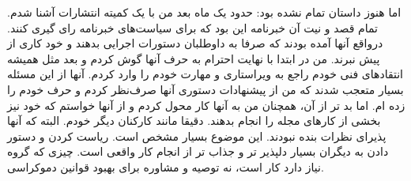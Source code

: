
اما هنوز داستان تمام نشده بود: حدود یک ماه بعد من با یک کمیته انتشارات آشنا شدم.
تمام قصد و نیت آن خبرنامه این بود که برای سیاست‌های خبرنامه رای گیری کنند. درواقع
آنها آمده بودند که صرفا به داوطلبان دستورات اجرایی بدهند و خود کاری از پیش نبرند.
من در ابتدا با نهایت احترام به حرف آنها گوش کردم و بعد مثل همیشه انتقادهای فنی خودم راجع به
ویراستاری و مهارت خودم را وارد کردم. آنها از این مسئله بسیار متعجب شدند که من از پیشنهادات دستوری
آنها صرف‌نظر کردم و حرف خودم را زده ام. اما بد تر از آن، همچنان من به آنها کار محول کردم و از آنها
خواستم که خود نیز بخشی از کار‌های مجله را انجام بدهند. دقیقا مانند کارکنان دیگر خودم.
البته که آنها پذیرای نظرات بنده نبودند. این موضوع بسیار مشخص است. ریاست کردن و دستور دادن به دیگران
بسیار دلپذیر تر و جذاب تر از انجام کار واقعی است. چیزی که گروه نیاز دارد کار است، نه توصیه و مشاوره برای
بهبود قوانین دموکراسی.


